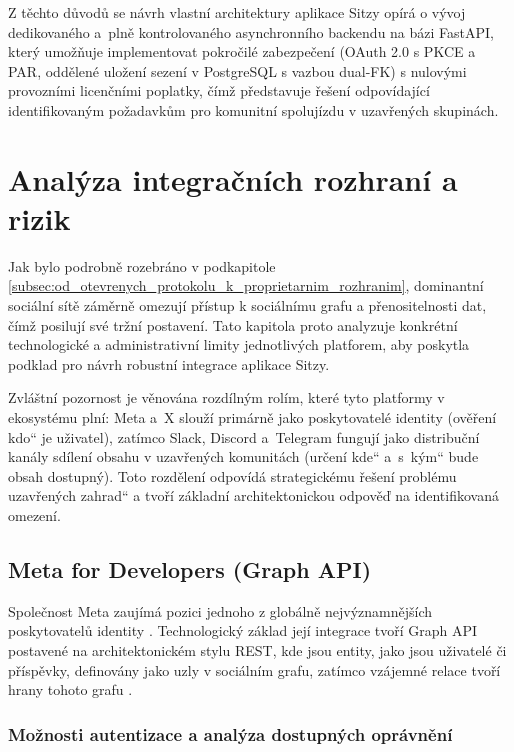 \documentclass[male,czech,api_bc]{kitheses}
\newcommand{\UV}[1]{\quotedblbase#1\textquotedblleft}
\begin{document}
Z těchto důvodů se návrh vlastní architektury aplikace Sitzy opírá o vývoj dedikovaného a~plně kontrolovaného asynchronního backendu na bázi FastAPI, který umožňuje implementovat pokročilé zabezpečení (OAuth 2.0 s PKCE a PAR, oddělené uložení sezení v PostgreSQL s vazbou dual-FK) s nulovými provozními licenčními poplatky, čímž představuje řešení odpovídající identifikovaným požadavkům pro komunitní spolujízdu v uzavřených skupinách.

\chapter{Analýza integračních rozhraní a rizik}
\label{chap:analyza_poskytovatelu}

Jak bylo podrobně rozebráno v podkapitole \vref{subsec:od_otevrenych_protokolu_k_proprietarnim_rozhranim}, dominantní sociální sítě záměrně omezují přístup k sociálnímu grafu a přenositelnosti dat, čímž posilují své tržní postavení. Tato kapitola proto analyzuje konkrétní technologické a administrativní limity jednotlivých platforem, aby poskytla podklad pro návrh robustní integrace aplikace Sitzy.

Zvláštní pozornost je věnována rozdílným rolím, které tyto platformy v ekosystému plní: Meta a~X slouží primárně jako poskytovatelé identity (ověření \UV{kdo} je uživatel), zatímco Slack, Discord a~Telegram fungují jako distribuční kanály sdílení obsahu v uzavřených komunitách (určení \UV{kde} a~s~\UV{kým} bude obsah dostupný). Toto rozdělení odpovídá strategickému řešení problému \UV{uzavřených zahrad} a tvoří základní architektonickou odpověď na identifikovaná omezení.

\section{Meta for Developers (Graph API)}

Společnost Meta zaujímá pozici jednoho z globálně nejvýznamnějších poskytovatelů identity \cite{MetaDeveloper20251030}. Technologický základ její integrace tvoří Graph API postavené na architektonickém stylu REST, kde jsou entity, jako jsou uživatelé či příspěvky, definovány jako uzly v sociálním grafu, zatímco vzájemné relace tvoří hrany tohoto grafu \cite{Fielding2000,MetaDeveloper20251030}.

\subsection{Možnosti autentizace a analýza dostupných oprávnění}
\end{document}
